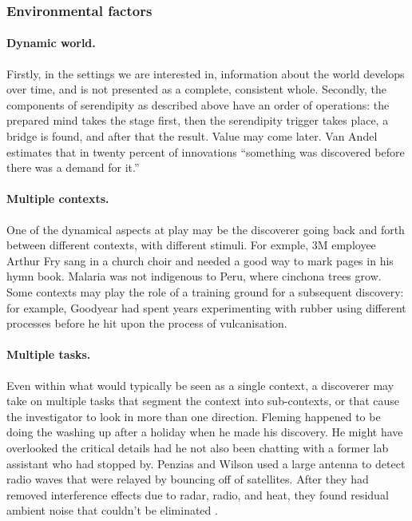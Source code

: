 \subsubsection*{Environmental factors}

\paragraph{Dynamic world.}

Firstly, in the settings we are interested in, information about the
world develops over time, and is not presented as a complete,
consistent whole.
%
Secondly, the components of serendipity as described above have an
order of operations: the prepared mind takes the stage first, then the
serendipity trigger takes place, a bridge is found, and after that the
result.  Value may come later.  Van Andel
\citeyear[p. 643]{van1994anatomy} estimates that in twenty percent of
innovations ``something was discovered before there was a demand for
it.''

\paragraph{Multiple contexts.}

One of the dynamical aspects at play may be the discoverer going back
and forth between different contexts, with different stimuli.
%
For exmple, 3M employee Arthur Fry sang in a church choir and needed a
good way to mark pages in his hymn book.  Malaria was not indigenous
to Peru, where cinchona trees grow.  Some contexts may play the role
of a training ground for a subsequent discovery: for example, Goodyear
had spent years experimenting with rubber using different processes
before he hit upon the process of vulcanisation.

\paragraph{Multiple tasks.}

Even within what would typically be seen as a single context, a
discoverer may take on multiple tasks that segment the context into
sub-contexts, or that cause the investigator to look in more than one
direction.
%
Fleming happened to be doing the washing up after a holiday when he
made his discovery.  He might have overlooked the critical details had
he not also been chatting with a former lab assistant who had stopped
by.  Penzias and Wilson used a large antenna to detect radio waves
that were relayed by bouncing off of satellites.  After they had
removed interference effects due to radar, radio, and heat, they found
residual ambient noise that couldn't be eliminated
\cite{wiki:cosmic-radiation}.

